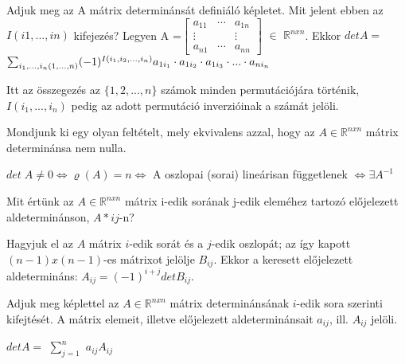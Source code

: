 \begin{frame}
  \begin{tcolorbox}[title={23}]
   Adjuk meg az A mátrix determinánsát definiáló képletet. Mit jelent ebben az $I(i1,...,in)$ kifejezés? 
  \tcblower
Legyen A =$\begin{bmatrix} 
  				a_{11} & \cdots & a_{1n}  \\
  				\vdots &   & \vdots \\
  				a_{n1} & \cdots & a_{nn}
			\end{bmatrix}$ $\in$ $\mathbb{R}^{n x n}$. Ekkor $det A = $ $\sum_{i_1, ..., i_n\\ (1, ..., n)} (-1)^{I(i_1, i_2, ..., i_n)} a_{1i_1} \cdot a_{1i_2} \cdot a_{1i_3} \cdot ... \cdot a_{ni_n}$\\
    \mmedskip
			

Itt az összegezés az $\{1,2,...,n\}$ számok minden permutációjára történik, $I(i_1,...,i_n)$ pedig az adott permutáció inverzióinak a számát jelöli.
  \end{tcolorbox}
\end{frame}


\begin{frame}
  \begin{tcolorbox}[title={24}]
   Mondjunk ki egy olyan feltételt, mely ekvivalens azzal, hogy az $A \in \mathbb{R}^{n x n}$ mátrix determinánsa nem nulla.

  \tcblower
$det \; A \neq 0 \iff {\varrho}(A) = n \iff$ A oszlopai (sorai) lineárisan függetlenek $\iff {\exists}A^{-1}$

  \end{tcolorbox}
\end{frame}


\begin{frame}
  \begin{tcolorbox}[title={25}]
   Mit értünk az $A \in \mathbb{R}^{n x n}$ mátrix i-edik sorának j-edik eleméhez tartozó előjelezett aldeterminánson, $A*{ij}$-n?

  \tcblower
Hagyjuk el az $A$ mátrix $i$-edik sorát és a $j$-edik oszlopát; az így kapott $(n-1)x(n-1)$-es mátrixot jelölje $B_{ij}$. Ekkor a keresett előjelezett aldetermináns: $A_{ij} = (-1)^{i+j} det B_{ij}$.

  \end{tcolorbox}
\end{frame}

\begin{frame}
  \begin{tcolorbox}[title={26}]
   Adjuk meg képlettel az $A \in \mathbb{R}^{n x n}$ mátrix determinánsának $i$-edik sora szerinti kifejtését. A mátrix elemeit, illetve előjelezett aldeterminánsait $a_{ij}$, ill. $A_{ij}$ jelöli.

  \tcblower
$detA =$ $\sum_{j = 1}^n$ $a_{ij}A_{ij}$
  \end{tcolorbox}
\end{frame}


